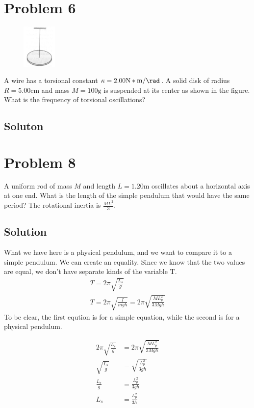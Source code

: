 \documentclass[12pt]{article}
\begin{document}
\pagebreak
\section{Problem 6}
\begin{figure}
    \vspace{-30pt}
    \includegraphics[width=0.15\textwidth]{graph_6.png} 
\end{figure}
A wire has a torsional constant $\kappa = 2.00 \unit{\newton*\meter/\rad}$. A solid disk of radius $R = 5.00 \unit{\centi\meter}$ and mass $M = 100 \unit{\gram}$ is suspended at its center as shown in the figure. What is the frequency of torsional oscillations?

\subsection{Soluton}



\pagebreak
\section{Problem 8}
A uniform rod of mass $M$ and length $L = 1.20 \unit{\meter}$ oscillates about a horizontal axis at one end. What is the length of the simple pendulum that would have the same period? The rotational inertia is $\frac{ML^2}{3}$.

\subsection{Solution}
What we have here is a physical pendulum, and we want to compare it to a simple pendulum. We can create an equality. Since we know that the two values are equal, we don't have separate kinds of the variable T. 
\begin{gather}
    T   =   2\pi\sqrt{\frac{L_s}{g}}\\
    T   =   2\pi\sqrt{\frac{I}{mgh}}
        =   2\pi\sqrt{\frac{ML_p^2}{3Mgh}}
\end{gather}
To be clear, the first eqution is for a simple equation, while the second is for a physical pendulum.

\begin{align}
    2\pi\sqrt{\frac{L_s}{g}}    &=  2\pi\sqrt{\frac{ML_p^2}{3Mgh}}\\
    \sqrt{\frac{L_s}{g}}  &=  \sqrt{\frac{L_p^2}{3gh}}\\
    \frac{L_s}{g}   &=  \frac{L_p^2}{3gh}\\
    L_s &=  \frac{L_p^2}{3h}
\end{align}
\end{document}
